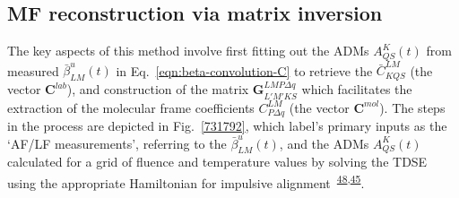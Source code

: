 \documentclass[10pt]{article}
\begin{document}


\subsection{MF reconstruction via matrix inversion\label{sec:Matrix-inversion-example}}

The key aspects of this method involve first fitting out the ADMs $A^K_{QS}(t)$ from measured $\bar{\beta}^u_{LM}(t)$ in Eq.~\ref{eqn:beta-convolution-C} to retrieve the $\bar{C}^{LM}_{KQS}$ (the vector $\mathbf{C}^{lab}$), and construction of the matrix $\mathbf{{G}}^{LMP\Delta q }_{L'M'KS}$ which facilitates the extraction of the molecular frame coefficients $C^{LM}_{P\Delta q}$ (the vector $\mathbf{C}^{mol}$). The steps in the process are depicted in Fig.~\ref{731792}, which label's primary inputs as the `AF/LF measurements', referring to the $\bar{\beta}^u_{LM}(t)$, and the ADMs $A^K_{QS}(t)$ calculated for a grid of fluence and temperature values by solving the TDSE using the appropriate Hamiltonian for impulsive alignment~\textsuperscript{\hyperref[csl:48]{48},\hyperref[csl:45]{45}}. 
\end{document}
